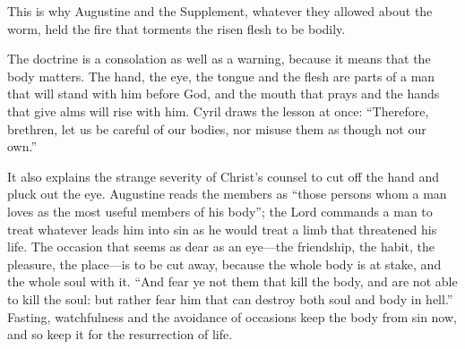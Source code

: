 \noindent This is why Augustine and the Supplement, whatever they allowed about the worm, held the fire that torments the risen flesh to be bodily.

The doctrine is a consolation as well as a warning, because it means that the body matters. The hand, the eye, the tongue and the flesh are parts of a man that will stand with him before God, and the mouth that prays and the hands that give alms will rise with him. Cyril draws the lesson at once: ``Therefore, brethren, let us be careful of our bodies, nor misuse them as though not our own.''

It also explains the strange severity of Christ's counsel to cut off the hand and pluck out the eye. Augustine reads the members as ``those persons whom a man loves as the most useful members of his body''; the Lord commands a man to treat whatever leads him into sin as he would treat a limb that threatened his life. The occasion that seems as dear as an eye---the friendship, the habit, the pleasure, the place---is to be cut away, because the whole body is at stake, and the whole soul with it. ``And fear ye not them that kill the body, and are not able to kill the soul: but rather fear him that can destroy both soul and body in hell.'' Fasting, watchfulness and the avoidance of occasions keep the body from sin now, and so keep it for the resurrection of life.
